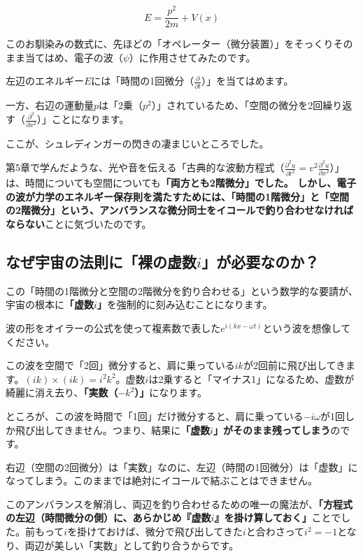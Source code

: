 \[E = \frac{p^2}{2m} + V(x)\]

このお馴染みの数式に、先ほどの「オペレーター（微分装置）」をそっくりそのまま当てはめ、電子の波（\(\psi\)）に作用させてみたのです。

左辺のエネルギー\(E\)には「時間の1回微分（\(\frac{\partial}{\partial t}\)）」を当てはめます。

一方、右辺の運動量\(p\)は「2乗（\(p^2\)）」されているため、「空間の微分を2回繰り返す（\(\frac{\partial^2}{\partial x^2}\)）」ことになります。

ここが、シュレディンガーの閃きの凄まじいところでした。

第5章で学んだような、光や音を伝える「古典的な波動方程式（\(\frac{\partial^2 u}{\partial t^2} = v^2 \frac{\partial^2 u}{\partial x^2}\)）」は、時間についても空間についても\textbf{「両方とも2階微分」でした。 しかし、電子の波が力学のエネルギー保存則を満たすためには、「時間の1階微分」と「空間の2階微分」という、アンバランスな微分同士をイコールで釣り合わせなければならない}ことに気づいたのです。

\subsection{なぜ宇宙の法則に「裸の虚数\(i\)」が必要なのか？}

この「時間の1階微分と空間の2階微分を釣り合わせる」という数学的な要請が、宇宙の根本に\textbf{「虚数\(i\)」}を強制的に刻み込むことになります。

波の形をオイラーの公式を使って複素数で表した\(e^{i(kx - \omega t)}\)という波を想像してください。

この波を空間で「2回」微分すると、肩に乗っている\(ik\)が2回前に飛び出してきます。\((ik) \times (ik) = i^2 k^2\)。虚数\(i\)は2乗すると「マイナス1」になるため、虚数が綺麗に消え去り、\textbf{「実数（\(-k^2\)）」}になります。

ところが、この波を時間で「1回」だけ微分すると、肩に乗っている\(-i\omega\)が1回しか飛び出してきません。つまり、結果に\textbf{「虚数\(i\)」がそのまま残ってしまう}のです。

右辺（空間の2回微分）は「実数」なのに、左辺（時間の1回微分）は「虚数」になってしまう。このままでは絶対にイコールで結ぶことはできません。

このアンバランスを解消し、両辺を釣り合わせるための唯一の魔法が、\textbf{「方程式の左辺（時間微分の側）に、あらかじめ『虚数\(i\)』を掛け算しておく」}ことでした。前もって\(i\)を掛けておけば、微分で飛び出してきた\(i\)と合わさって\(i^2 = -1\)となり、両辺が美しい「実数」として釣り合うからです。

